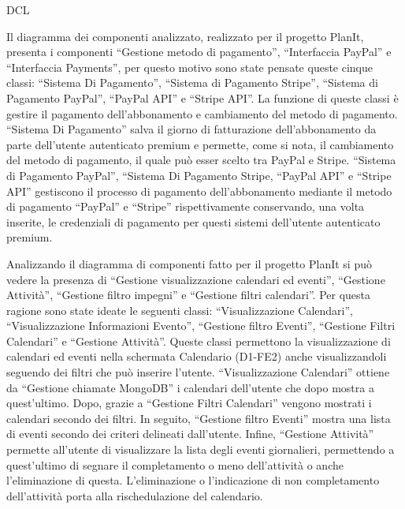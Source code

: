 \begin{listaPersonale}{DCL}
\begin{listaPersonale2}[DCL]{}
        Il diagramma dei componenti analizzato, realizzato per il progetto PlanIt, presenta i componenti “Gestione metodo di pagamento”, “Interfaccia PayPal” e “Interfaccia Payments”, per questo motivo sono state pensate queste cinque classi: “Sistema Di Pagamento”, “Sistema di Pagamento Stripe”, “Sistema di Pagamento PayPal”, “PayPal API” e “Stripe API”. La funzione di queste classi è gestire il pagamento dell'abbonamento e cambiamento del metodo di pagamento. “Sistema Di Pagamento” salva il giorno di fatturazione dell'abbonamento da parte dell'utente autenticato premium e  permette, come si nota, il cambiamento del metodo di pagamento, il quale può esser scelto tra PayPal e Stripe.
        “Sistema di Pagamento PayPal”, “Sistema Di Pagamento Stripe, “PayPal API” e “Stripe API” gestiscono il processo di pagamento dell'abbonamento mediante il metodo di pagamento “PayPal” e “Stripe” rispettivamente conservando, una volta inserite, le credenziali di pagamento per questi sistemi dell'utente autenticato premium.

    \end{listaPersonale2}


    Analizzando il diagramma di componenti fatto per il progetto PlanIt si può vedere la presenza di “Gestione visualizzazione calendari ed eventi”, “Gestione Attività”, “Gestione filtro impegni” e “Gestione filtri calendari”. Per questa ragione sono state ideate le seguenti classi: “Visualizzazione Calendari”,  “Visualizzazione Informazioni Evento”, “Gestione filtro Eventi”, “Gestione Filtri Calendari” e “Gestione Attività”. Queste classi permettono la visualizzazione di calendari ed eventi nella schermata Calendario (D1-FE2) anche visualizzandoli seguendo dei filtri che può inserire l'utente.
    “Visualizzazione Calendari” ottiene da “Gestione chiamate MongoDB” i calendari dell'utente che dopo mostra a quest'ultimo. Dopo, grazie a “Gestione Filtri Calendari” vengono mostrati i calendari secondo dei filtri.
    In seguito, “Gestione filtro Eventi” mostra una lista di eventi secondo dei criteri delineati dall'utente.
    Infine, “Gestione Attività”  permette all'utente di visualizzare la lista degli eventi giornalieri, permettendo a quest'ultimo di segnare il completamento o meno dell'attività o anche l'eliminazione di questa. L'eliminazione o l'indicazione di non completamento dell'attività porta alla rischedulazione del calendario.



\end{listaPersonale}
